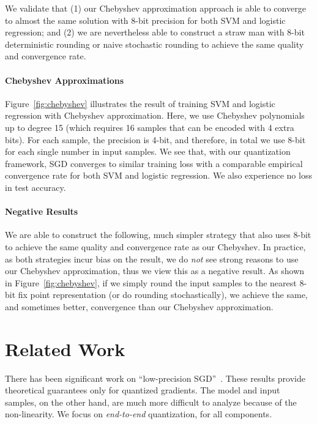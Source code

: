 \documentclass{article}
\begin{document}
We validate that (1) our Chebyshev 
approximation approach is able to
converge to almost the same solution 
with 8-bit precision for both SVM
and logistic regression;
and (2) we are nevertheless able to construct
a straw man with 8-bit deterministic 
rounding or naive stochastic rounding
to achieve the same quality and convergence 
rate.

\vspace{-1em}
\paragraph{Chebyshev Approximations}

Figure~\ref{fig:chebyshev} illustrates
the result of training SVM
and logistic regression 
with Chebyshev approximation. Here,
we use Chebyshev polynomials up to
degree 15 (which requires 16 samples
that can be encoded with 4 extra 
bits). For each sample, the precision
is 4-bit, and therefore, in total
we use 8-bit for each single number
in input samples. We see that, 
with our quantization framework,
SGD converges to similar training loss 
with a comparable empirical convergence 
rate for both SVM and logistic regression.
We also experience no loss in test accuracy.



\vspace{-1em}
\paragraph{Negative Results}

We are able to construct the following,
much simpler strategy that also
uses 8-bit to achieve the same quality
and convergence rate as our
Chebyshev. In practice, as both
strategies incur bias on the result,
we do {\em not} see strong reasons to
use our Chebyshev approximation, thus
we view this as a negative result.
As shown in Figure~\ref{fig:chebyshev},
if we simply round the input samples
to the nearest 8-bit fix point
representation (or do rounding
stochastically), we achieve the
same, and sometimes better,
convergence than our Chebyshev 
approximation.

\vspace{-1em}
\section{Related Work} 
\vspace{-1em}

There has been significant work on ``low-precision SGD''~\cite{DeSa:NIPS:2015,Alistarh:2016:ArXiv}. 
These results provide
theoretical guarantees only for quantized gradients.
The model and input samples, on the other hand, are much more difficult
to analyze because of the non-linearity. We focus on {\em end-to-end}
quantization, for all components.
\end{document}
